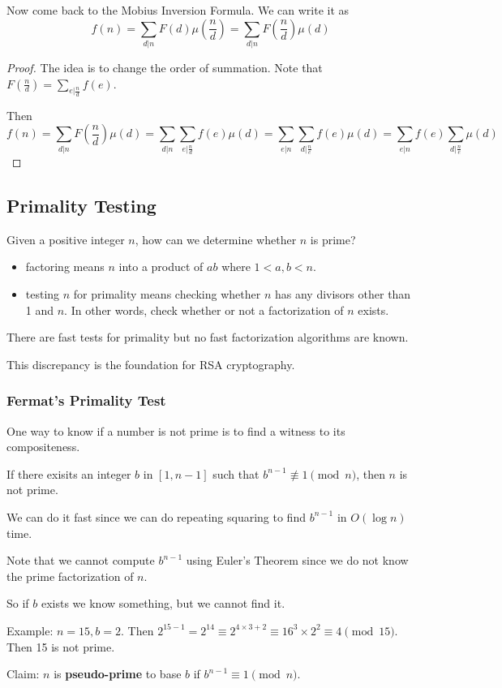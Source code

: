 \documentclass[letterpaper,12pt,oneside]{article}
\begin{document}
Now come back to the Mobius Inversion Formula. We can write it as \[
    f(n)=\sum_{d|n}F(d)\mu(\frac{n}{d})=\sum_{d|n}F(\frac{n}{d})\mu(d)
\]
\begin{proof}
    The idea is to change the order of summation. Note that $F(\frac{n}{d})=\sum_{e|\frac{n}{d}}f(e)$.

    Then \[
        f(n)=\sum_{d|n}F(\frac{n}{d})\mu(d)=\sum_{d|n}\sum_{e|\frac{n}{d}}f(e)\mu(d)=\sum_{e|n}\sum_{d|\frac{n}{e}}f(e)\mu(d)=\sum_{e|n}f(e)\sum_{d|\frac{n}{e}}\mu(d)
    \]
\end{proof}
\subsection{Primality Testing}
Given a positive integer $n$, how can we determine whether $n$ is prime?
\begin{itemize}
    \item factoring means $n$ into a product of $ab$ where $1<a,b<n$.
    \item testing $n$ for primality means checking whether $n$ has any divisors other than 1 and $n$. In other words, check whether or not a factorization of $n$ exists.
\end{itemize}

There are fast tests for primality but no fast factorization algorithms are known.

This discrepancy is the foundation for RSA cryptography. 
\subsubsection{Fermat's Primality Test}
One way to know if a number is not prime is to find a witness to its compositeness.

If there exisits an integer $b$ in $[1,n-1]$ such that $b^{n-1}\not\equiv 1 \pmod n$, then $n$ is not prime.

We can do it fast since we can do repeating squaring to find $b^{n-1}$ in $O(\log n)$ time.

Note that we cannot compute $b^{n-1}$ using Euler's Theorem since we do not know the prime factorization of $n$.

So if $b$ exists we know something, but we cannot find it. 

Example: $n=15,b=2$. Then $2^{15-1}=2^{14}\equiv 2^{4\times 3 +2}\equiv 16^3 \times 2^2 \equiv 4 \pmod {15}$. Then 15 is not prime.

Claim: $n$ is \textbf{pseudo-prime} to base $b$ if $b^{n-1}\equiv 1 \pmod n$.
\end{document}
